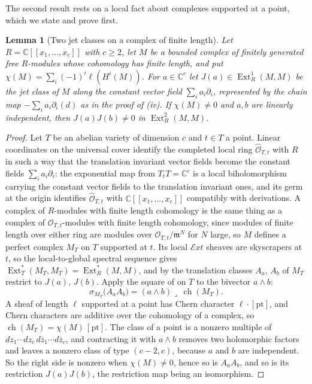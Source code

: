 \documentclass[11pt,reqno]{amsart}
\theoremstyle{plain}
\newtheorem{lemma}[theorem]{Lemma}
\theoremstyle{definition}
\theoremstyle{remark}
\newcommand{\CC}{\mathbb{C}}
\newcommand{\cE}{\mathcal{E}}
\newcommand{\cO}{\mathcal{O}}
\DeclareMathOperator{\ch}{ch}
\DeclareMathOperator{\Ext}{Ext}
\newcommand{\bbar}[1]{\overline{#1}}
\begin{document}
The second result rests on a local fact about complexes supported at a point,
which we state and prove first.

\begin{lemma}[Two jet classes on a complex of finite length]
\label{lem:finiteproduct}
Let $R=\CC[[x_{1},\dots,x_{c}]]$ with $c\ge2$, let $M$ be a bounded complex of
finitely generated free $R$-modules whose cohomology has finite length, and
put $\chi(M)=\sum_{i}(-1)^{i}\ell(H^{i}(M))$. For $a\in\CC^{c}$ let
$J(a)\in\Ext^{1}_{R}(M,M)$ be the jet class of $M$ along the constant vector
field $\sum_{i}a_{i}\partial_{i}$, represented by the chain map
$-\sum_{i}a_{i}\partial_{i}(d)$ as in the proof of (iv).
If $\chi(M)\ne0$ and $a,b$ are linearly independent, then $J(a)J(b)\ne0$ in
$\Ext^{2}_{R}(M,M)$.
\end{lemma}

\begin{proof}
Let $T$ be an abelian variety of dimension $c$ and $t\in T$ a point. Linear
coordinates on the universal cover identify the completed local ring
$\widehat{\cO}_{T,t}$ with $R$ in such a way that the translation invariant
vector fields become the constant fields $\sum_{i}a_{i}\partial_{i}$: the
exponential map from $T_{t}T=\CC^{c}$ is a local biholomorphism carrying the
constant vector fields to the translation invariant ones, and its germ at the
origin identifies $\widehat{\cO}_{T,t}$ with $\CC[[x_{1},\dots,x_{c}]]$
compatibly with derivations. A complex of $R$-modules with finite length
cohomology is the same thing as a complex of $\cO_{T,t}$-modules with finite
length cohomology, since modules of finite length over either ring are
modules over $\cO_{T,t}/\mathfrak{m}^{N}$ for $N$ large, so $M$ defines a
perfect complex $M_{T}$ on $T$ supported at $t$. Its local $\cE xt$ sheaves
are skyscrapers at $t$, so the local-to-global spectral sequence gives
$\Ext^{*}_{T}(M_{T},M_{T})=\Ext^{*}_{R}(M,M)$, and by  the
translation classes $A_{a}$, $A_{b}$ of $M_{T}$ restrict to $J(a)$, $J(b)$.
Apply the square of  on $T$ to the bivector $a\wedge b$:
\[
  \sigma_{M_{T}}\bigl(A_{a}A_{b}\bigr)=(a\wedge b)\lrcorner\,\ch(M_{T}).
\]
A sheaf of length $\ell$ supported at a point has Chern character
$\ell\cdot[\mathrm{pt}]$, and Chern characters are additive over the
cohomology of a complex, so $\ch(M_{T})=\chi(M)\,[\mathrm{pt}]$. The class of a
point is a nonzero multiple of $dz_{1}\cdots dz_{c}\,d\bbar z_{1}\cdots
d\bbar z_{c}$, and contracting it with $a\wedge b$ removes two holomorphic
factors and leaves a nonzero class of type $(c-2,c)$, because $a$ and $b$ are
independent. So the right side is nonzero when $\chi(M)\ne0$, hence so is
$A_{a}A_{b}$, and so is its restriction $J(a)J(b)$, the restriction map being
an isomorphism.
\end{proof}
\end{document}
